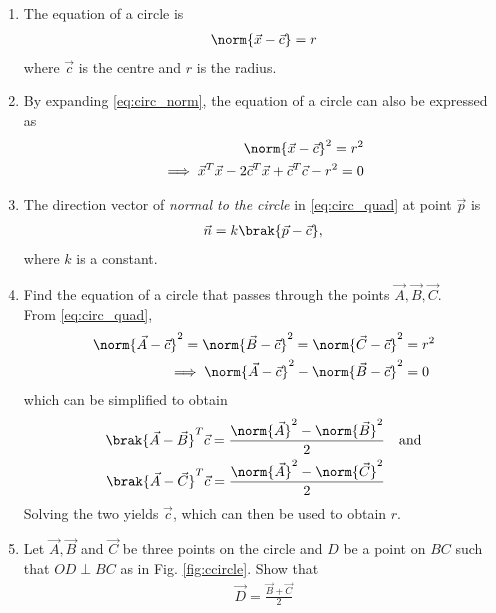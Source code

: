 \renewcommand{\theequation}{\theenumi}
\begin{enumerate}[label=\arabic*.,ref=\thesubsection.\theenumi]
\item The equation of a circle is 
\begin{align}
\label{eq:circ_norm}
\norm{\vec{x}-\vec{c}} = r
\end{align}
%
where $\vec{c}$ is the centre and $r$ is the radius.
\item By expanding \eqref{eq:circ_norm}, the equation of a circle can also be expressed as
%
\begin{align}
\norm{\vec{x}-\vec{c}}^2 = r^2&
\\
\implies \vec{x}^T\vec{x}-2\vec{c}^T\vec{x} + \vec{c}^T\vec{c}-r^2 = 0
\label{eq:circ_quad}
\end{align}
\item The direction vector of {\em normal to the circle}  in \eqref{eq:circ_quad} at point $\vec{p}$ is
\begin{align}
\label{eq:circ_normal}
\vec{n} = k\brak{\vec{p}-\vec{c}},
\end{align}
%
where $k$ is a constant.
\item Find the equation of a circle that passes through the points $\vec{A},\vec{B},\vec{C}$.
\\
\solution From \eqref{eq:circ_quad},
\begin{align}
\norm{\vec{A}-\vec{c}}^2 = \norm{\vec{B}-\vec{c}}^2 = \norm{\vec{C}-\vec{c}}^2 &= r^2
\\
\implies \norm{\vec{A}-\vec{c}}^2 - \norm{\vec{B}-\vec{c}}^2 &=0
\end{align}
which can be simplified to obtain
\begin{align}
\brak{\vec{A}-\vec{B}}^T\vec{c}=\frac{\norm{\vec{A}}^2 - \norm{\vec{B}}^2}{2}& \quad \text{and}
\\
\brak{\vec{A}-\vec{C}}^T\vec{c}=\frac{\norm{\vec{A}}^2 - \norm{\vec{C}}^2}{2}& 
\end{align}
%
Solving the two yields $\vec{c}$, which can then be used to obtain $r$.
\item Let $\vec{A},\vec{B}$ and $\vec{C}$ be three points on the circle and 
$D$ be a point on $BC$ such that
$OD \perp BC$ as in Fig. \ref{fig:ccircle}.  Show that 
\begin{align}
\vec{D}=\frac{\vec{B}+\vec{C}}{2}
\end{align}
%
\begin{figure}[!ht]
	\begin{center}
		

\end{center}
\end{figure}
\end{enumerate}

